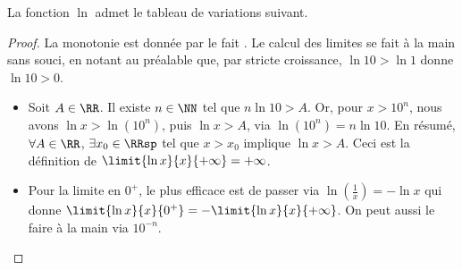\begin{fact} \label{ln-tab-var}
	La fonction $\ln$ admet le tableau de variations suivant.
	\begin{center}
	\end{center}
\end{fact}


\begin{proof}
	La monotonie est donnée par le fait .
	Le calcul des limites se fait à la main sans souci, en notant au préalable que, par stricte croissance, $\ln 10 > \ln 1$ donne $\ln 10 > 0$.
	\begin{itemize}
		\item Soit $A \in \RR$.
		Il existe $n \in \NN$ tel que $n \ln 10 > A$.
		Or, pour $x > 10^n$, nous avons $\ln x > \ln(10^n)$, puis $\ln x > A$, via $\ln(10^n) = n \ln 10$.
		En résumé,
		$\forall A \in \RR$, $\exists x_0 \in \RRsp$ tel que $x > x_0$ implique $\ln x > A$.
		Ceci est la définition de $\limit{\ln x}{x}{+ \infty} = +\infty$.
		
		\item Pour la limite en $0^+$, le plus efficace est de passer via $\ln(\frac1x) = - \ln x$ qui donne
		$\limit{\ln x}{x}{0^+} = - \limit{\ln x}{x}{+ \infty}$.
		On peut aussi le faire à la main via $10^{-n}$.
	\end{itemize}
	
	\null
	\vspace{-6ex}
\end{proof}

\vspace{1ex}
